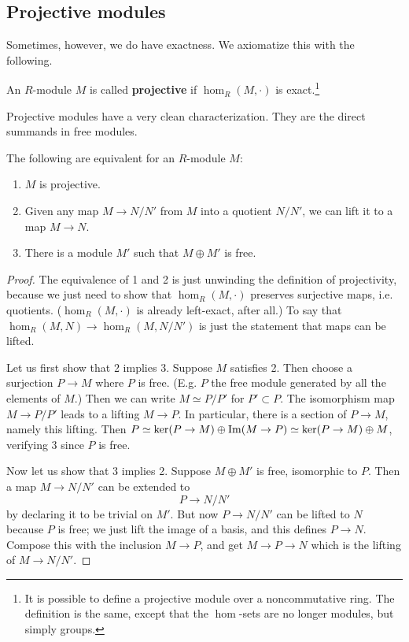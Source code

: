 \subsection{Projective modules}

Sometimes, however, we do have exactness. We axiomatize this with the
following.

\begin{definition}
An $R$-module $M$ is called \textbf{projective} if $\hom_R(M, \cdot)$ is
exact.\footnote{It is possible to define a projective module over a
noncommutative ring. The definition is the same, except that the $\hom$-sets
are no longer modules, but simply groups. }
\end{definition}

Projective modules have a very clean characterization. They are the direct
summands in free modules.

\begin{proposition} \label{projmod}
The following are equivalent for an $R$-module $M$:
\begin{enumerate}
\item $M$ is projective.
\item Given any map $M \to N/N'$ from $M$ into a quotient $N/N'$, we can lift
it to a map $M \to N$.
\item There is a module $M'$ such that $M \oplus M'$ is free.
\end{enumerate}
\end{proposition}
\begin{proof}
The equivalence of 1 and 2 is just unwinding the definition of projectivity,
because we just need to show that $\hom_R(M, \cdot)$ preserves surjective
maps, i.e. quotients.  ($\hom_R(M, \cdot)$ is already left-exact, after all.)
To say that $\hom_R(M, N) \to \hom_R(M, N/N')$ is just the statement that maps
can be lifted.

Let us first show that 2 implies 3.  Suppose $M$ satisfies 2.  Then choose a
surjection $P \to M$ where $P$ is free. (E.g. $P$ the free module generated by
all the elements of $M$.)
Then we can write $M \simeq P/P'$ for $P' \subset P$. The isomorphism map
$M \to P/P'$
leads to a lifting $M \to P$.  In particular, there is a section of $P \to M$,
namely this lifting.  Then $P \simeq \ker(P \to M) \oplus \operatorname{Im}(M \to P) \simeq
\ker(P \to M) \oplus M$,
verifying 3 since $P$ is free.

Now let us show that 3 implies 2.
Suppose $M \oplus M'$ is free, isomorphic to $P$. Then a map $M \to N/N'$ can
be extended to
\[ P \to N/N'  \]
by declaring it to be trivial on $M'$.  But now $P \to N/N'$ can be lifted to
$N$ because $P$ is free; we just lift the image of a basis, and this defines $P
\to N$.  Compose this with the inclusion $M \to P$, and get $M \to P \to N$
which is the lifting of $M \to N/N'$.
\end{proof}

